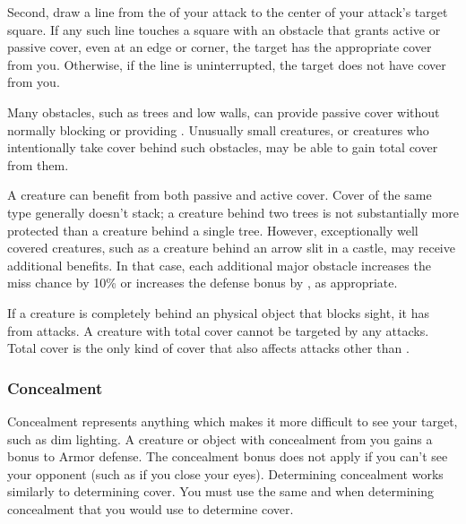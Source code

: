             Second, draw a line from the  of your attack to the center of your attack's target square.
            If any such line touches a square with an obstacle that grants active or passive cover, even at an edge or corner, the target has the appropriate cover from you.
            Otherwise, if the line is uninterrupted, the target does not have cover from you.

             Many obstacles, such as trees and low walls, can provide passive cover without normally blocking  or providing .
            Unusually small creatures, or creatures who intentionally take cover behind such obstacles, may be able to gain total cover from them.

            A creature can benefit from both passive and active cover.
            Cover of the same type generally doesn't stack; a creature behind two trees is not substantially more protected than a creature behind a single tree.
            However, exceptionally well covered creatures, such as a creature behind an arrow slit in a castle, may receive additional benefits.
            In that case, each additional major obstacle increases the miss chance by 10\% or increases the defense bonus by , as appropriate.

            \label{Total Cover}
            If a creature is completely behind an physical object that blocks sight, it has  from attacks.
            A creature with total cover cannot be targeted by any attacks.
            Total cover is the only kind of cover that also affects attacks other than .

        \subsubsection{Concealment}\label{Concealment}
            Concealment represents anything which makes it more difficult to see your target, such as dim lighting.
            A creature or object with concealment from you gains a  bonus to Armor defense.
            The concealment bonus does not apply if you can't see your opponent (such as if you close your eyes).
            Determining concealment works similarly to determining cover.
            You must use the same  and  when determining concealment that you would use to determine cover.

